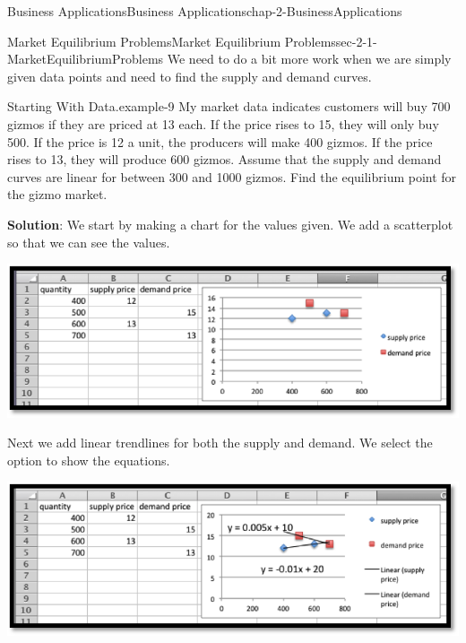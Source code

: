\documentclass[oneside,10pt,]{book}
\newcommand{\terminology}[1]{\textbf{#1}}
\numberwithin{equation}{section}
\begin{document}
\begin{chapterptx}{Business Applications}{}{Business Applications}{}{}{chap-2-BusinessApplications}
\begin{sectionptx}{Market Equilibrium Problems}{}{Market Equilibrium Problems}{}{}{sec-2-1-MarketEquilibriumProblems}
We need to do a bit more work when we are simply given data points and need to find the supply and demand curves.%
\begin{example}{Starting With Data.}{example-9}%
\hypertarget{p-571}{}%
My market data indicates customers will buy 700 gizmos if they are priced at \textdollar{}13 each.  If the price rises to \textdollar{}15, they will only buy 500.  If the price is \textdollar{}12 a unit, the producers will make 400 gizmos.  If the price rises to \textdollar{}13, they will produce 600 gizmos.  Assume that the supply and demand curves are linear for between 300 and 1000 gizmos.  Find the equilibrium point for the gizmo market.%
\par
\hypertarget{p-572}{}%
\terminology{Solution}: We start by making a chart for the values given. We add a scatterplot so that we can see the values. \begin{sidebyside}{1}{0.1}{0.1}{0}%
\begin{sbspanel}{0.8}%
\includegraphics[width=1\linewidth]{images/sec2-1-4.png}
\end{sbspanel}%
\end{sidebyside}%
%
\par
\hypertarget{p-573}{}%
Next we add linear trendlines for both the supply and demand.  We select the option to show the equations. \leavevmode%
\begin{sidebyside}{1}{0.1}{0.1}{0}%
\begin{sbspanel}{0.8}%
\includegraphics[width=1\linewidth]{images/sec2-1-5.png}
\end{sbspanel}%
\end{sidebyside}%

\end{example}
\end{sectionptx}
\end{chapterptx}
\end{document}

